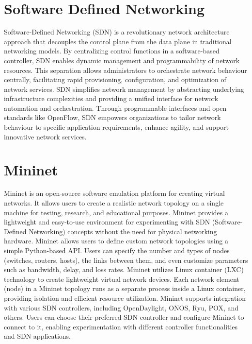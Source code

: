 \section{Software Defined Networking}
\vspace{-18pt}
Software-Defined Networking (SDN) is a revolutionary network architecture approach that decouples the control plane from the data plane in traditional networking models. By centralizing control functions in a software-based controller, SDN enables dynamic management and programmability of network resources. This separation allows administrators to orchestrate network behaviour centrally, facilitating rapid provisioning, configuration, and optimization of network services. SDN simplifies network management by abstracting underlying infrastructure complexities and providing a unified interface for network automation and orchestration. Through programmable interfaces and open standards like OpenFlow, SDN empowers organizations to tailor network behaviour to specific application requirements, enhance agility, and support innovative network services.
\section{Mininet}
\vspace{-18pt}
Mininet is an open-source software emulation platform for creating virtual networks. It allows users to create a realistic network topology on a single machine for testing, research, and educational purposes. Mininet provides a lightweight and easy-to-use environment for experimenting with SDN (Software-Defined Networking) concepts without the need for physical networking hardware. Mininet allows users to define custom network topologies using a simple Python-based API. Users can specify the number and types of nodes (switches, routers, hosts), the links between them, and even customize parameters such as bandwidth, delay, and loss rates. Mininet utilizes Linux container (LXC) technology to create lightweight virtual network devices. Each network element (node) in a Mininet topology runs as a separate process inside a Linux container, providing isolation and efficient resource utilization. Mininet supports integration with various SDN controllers, including OpenDaylight, ONOS, Ryu, POX, and others. Users can choose their preferred SDN controller and configure Mininet to connect to it, enabling experimentation with different controller functionalities and SDN applications.
